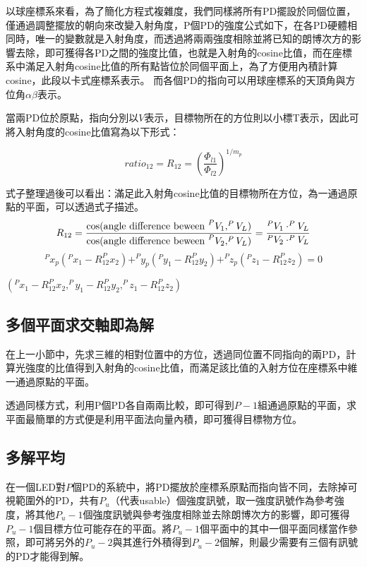 以球座標系來看，為了簡化方程式複雜度，我們同樣將所有PD擺設於同個位置，僅通過調整擺放的朝向來改變入射角度，P個PD的強度公式如下，在各PD硬體相同時，唯一的變數就是入射角度，而透過將兩兩強度相除並將已知的朗博次方的影響去除，即可獲得各PD之間的強度比值，也就是入射角的cosine比值，而在座標系中滿足入射角cosine比值的所有點皆位於同個平面上，為了方便用內積計算cosine，此段以卡式座標系表示。
而各個PD的指向可以用球座標系的天頂角與方位角$\alpha\beta$表示。

當兩PD位於原點，指向分別以$V$表示，目標物所在的方位則以小標T表示，因此可將入射角度的cosine比值寫為以下形式：

\begin{equation}
    ratio_{12}=R_{12}=\left(\frac{\Phi_{l1}}{\Phi_{l2}}\right)^{1/m_p}
    \end{equation}

式子整理過後可以看出：滿足此入射角cosine比值的目標物所在方位，為一通過原點的平面，可以透過式子描述。
\begin{equation}
    R_{12} =\frac{ \cos(\text{angle difference beween }^{P}V_1,^{P}V_L)}{\cos(\text{angle difference beween }^{P}V_2,^{P}V_L)} \\
    =\frac{^{P}V_1\cdot^{P}V_L}{^{P}V_2\cdot^{P}V_L}
\end{equation}
\begin{equation}
    ^{P}x_p(^{P}x_1-R_{12}^{P}x_2)+^{P}y_p(^{P}y_1-R_{12}^{P}y_2)+^{P}z_p(^{P}z_1-R_{12}^{P}z_2)=0
\end{equation}

$(^{P}x_1-R_{12}^{P}x_2,^{P}y_1-R_{12}^{P}y_2,^{P}z_1-R_{12}^{P}z_2)$

\subsection{多個平面求交軸即為解}

在上一小節中，先求三維的相對位置中的方位，透過同位置不同指向的兩PD，計算光強度的比值得到入射角的cosine比值，而滿足該比值的入射方位在座標系中維一通過原點的平面。

透過同樣方式，利用P個PD各自兩兩比較，即可得到$P-1$組通過原點的平面，求平面最簡單的方式便是利用平面法向量內積，即可獲得目標物方位。

\subsection{多解平均}

在一個LED對$P$個PD的系統中，將PD擺放於座標系原點而指向皆不同，去除掉可視範圍外的PD，共有$P_u$（代表usable）個強度訊號，取一強度訊號作為參考強度，將其他$P_u-1$個強度訊號與參考強度相除並去除朗博次方的影響，即可獲得$P_u-1$個目標方位可能存在的平面。將$P_u-1$個平面中的其中一個平面同樣當作參照，即可將另外的$P_u-2$與其進行外積得到$P_u-2$個解，則最少需要有三個有訊號的PD才能得到解。

